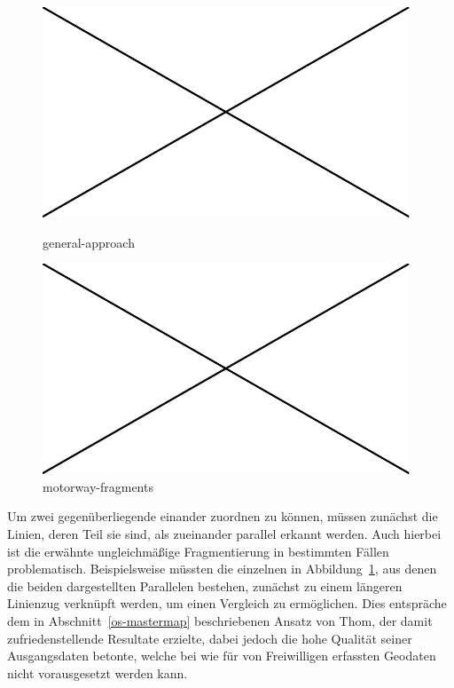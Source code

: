 \documentclass[../main/thesis.tex]{subfiles}
\begin{document}
\begin{figure}[ht]
  \begin{minipage}[t]{.5\linewidth}
    \centering
    \includegraphics[width=\ScaleIfNeeded]{../image-missing}
    \caption{general-approach}\label{fig:general-approach}
  \end{minipage}%
  \begin{minipage}[t]{.5\linewidth}
    \centering
    \includegraphics[width=\ScaleIfNeeded]{../image-missing}
    \caption{motorway-fragments}\label{fig:motorway-fragments}
  \end{minipage}
\end{figure}

Um zwei gegenüberliegende  einander zuordnen zu können, müssen zunächst die Linien, deren Teil sie sind, als zueinander parallel erkannt werden.
Auch hierbei ist die erwähnte ungleichmäßige Fragmentierung in bestimmten Fällen problematisch.
Beispielsweise müssten die einzelnen  in Abbildung~\ref{fig:motorway-fragments}, aus denen die beiden dargestellten Parallelen bestehen, zunächst zu einem längeren Linienzug verknüpft werden, um einen Vergleich zu ermöglichen.
Dies entspräche dem in Abschnitt~\ref{os-mastermap} beschriebenen Ansatz von Thom, der damit zufriedenstellende Resultate erzielte, dabei jedoch die hohe Qualität seiner Ausgangsdaten betonte, welche bei wie für \osm{} von Freiwilligen erfassten Geodaten nicht vorausgesetzt werden kann.
\end{document}
